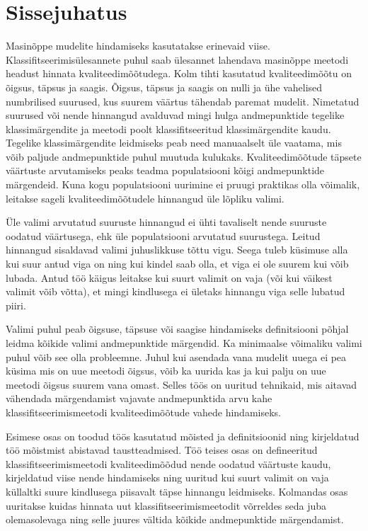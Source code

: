 \section{Sissejuhatus}
Masinõppe mudelite hindamiseks kasutatakse erinevaid viise. Klassifitseerimisülesannete puhul saab ülesannet lahendava masinõppe meetodi headust hinnata kvaliteedimõõtudega. Kolm tihti kasutatud kvaliteedimõõtu on õigsus, täpsus ja saagis. Õigsus, täpsus ja saagis on nulli ja ühe vahelised numbrilised suurused, kus suurem väärtus tähendab paremat mudelit. Nimetatud suurused või nende hinnangud avalduvad mingi hulga andmepunktide tegelike klassimärgendite ja meetodi poolt klassifitseeritud klassimärgendite kaudu. Tegelike klassimärgendite leidmiseks peab need manuaalselt üle vaatama, mis võib paljude andmepunktide puhul muutuda kulukaks. Kvaliteedimõõtude täpsete väärtuste arvutamiseks peaks teadma populatsiooni kõigi andmepunktide märgendeid. Kuna kogu populatsiooni uurimine ei pruugi praktikas olla võimalik, leitakse sageli kvaliteedimõõtudele hinnangud üle lõpliku valimi.

Üle valimi arvutatud suuruste hinnangud ei ühti tavaliselt nende suuruste oodatud väärtusega, ehk üle populatsiooni arvutatud suurustega. Leitud hinnangud sisaldavad valimi juhuslikkuse tõttu vigu. Seega tuleb küsimuse alla kui suur antud viga on ning kui kindel saab olla, et viga ei ole suurem kui võib lubada. Antud töö käigus leitakse kui suurt valimit on vaja (või kui väikest valimit võib võtta), et mingi kindlusega ei ületaks hinnangu viga selle lubatud piiri.

Valimi puhul peab õigsuse, täpsuse või saagise hindamiseks definitsiooni põhjal leidma kõikide valimi andmepunktide märgendid. Ka minimaalse võimaliku valimi puhul võib see olla probleemne. Juhul kui asendada vana mudelit uuega ei pea küsima mis on uue meetodi õigsus, võib ka uurida kas ja kui palju on uue meetodi õigsus suurem vana omast. Selles töös on uuritud tehnikaid, mis aitavad vähendada märgendamist vajavate andmepunktida arvu kahe klassifitseerimismeetodi kvaliteedimõõtude vahede hindamiseks.

Esimese osas on toodud töös kasutatud mõisted ja definitsioonid ning kirjeldatud töö mõistmist abistavad taustteadmised. Töö teises osas on defineeritud klassifitseerimismeetodi kvaliteedimõõdud nende oodatud väärtuste kaudu, kirjeldatud viise nende hindamiseks ning uuritud kui suurt valimit on vaja küllaltki suure kindlusega piisavalt täpse hinnangu leidmiseks. Kolmandas osas uuritakse kuidas hinnata uut klassifitseerimismeetodit võrreldes seda juba olemasolevaga ning selle juures vältida kõikide andmepunktide märgendamist.